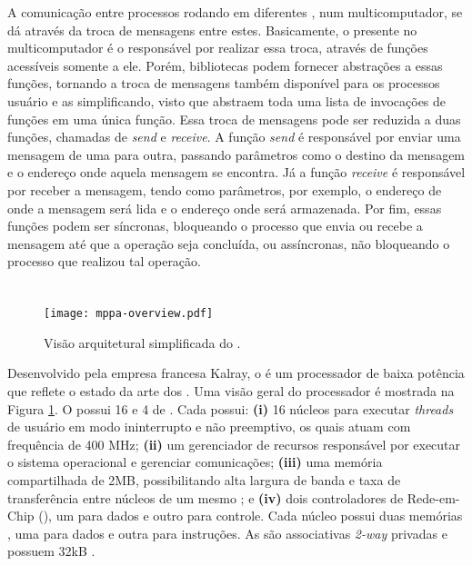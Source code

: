 A comunicação entre processos rodando em diferentes \CPUs, num multicomputador, se dá através da troca de mensagens entre estes. Basicamente, o \SO presente no multicomputador é o responsável por realizar essa troca, através de funções acessíveis somente a ele. Porém, bibliotecas podem fornecer abstrações a essas funções, tornando a troca de mensagens também disponível para os processos usuário e as simplificando, visto que abstraem toda uma lista de invocações de funções em uma única função. Essa troca de mensagens pode ser reduzida a duas funções, chamadas de \textit{send} e \textit{receive}. A função \textit{send} é responsável por enviar uma mensagem de uma \CPU para outra, passando parâmetros como o destino da mensagem e o endereço onde aquela mensagem se encontra. Já a função \textit{receive} é responsável por receber a mensagem, tendo como parâmetros, por exemplo, o endereço de onde a mensagem será lida e o endereço onde será armazenada. Por fim, essas funções podem ser síncronas, bloqueando o processo que envia ou recebe a mensagem até que a operação seja concluída, ou assíncronas, não bloqueando o processo que realizou tal operação.

\section{\mppa}
\label{sec:mppa256}

\begin{figure}[tb]
  \centering
  \caption{Visão arquitetural simplificada do \mppa.}
  \label{fig:mppa256overview}
  \texttt{[image: mppa-overview.pdf]}
\end{figure}

Desenvolvido pela empresa francesa Kalray, o \mppa é um processador de baixa potência que reflete o estado da arte dos \manycore. Uma visão geral do processador é mostrada na Figura \ref{fig:mppa256overview}. O \mppa possui 16 \CCs e 4 \clusters de \IO. Cada \CC possui: \textbf{(i)} 16 núcleos para executar \textit{threads} de usuário em modo ininterrupto e não preemptivo, os quais atuam com frequência de 400 MHz; \textbf{(ii)} um gerenciador de recursos responsável por executar
o sistema operacional e gerenciar comunicações; \textbf{(iii)} uma memória compartilhada de 2MB, possibilitando alta largura de banda e taxa de transferência entre núcleos de um mesmo \cluster; e \textbf{(iv)} dois controladores de Rede-em-Chip (\NoC), um para dados e outro para controle. Cada núcleo possui duas memórias \cache, uma para dados e outra para instruções. As \caches são associativas \textit{2-way} privadas e possuem 32kB \cite{Podesta2018Stencil}.

